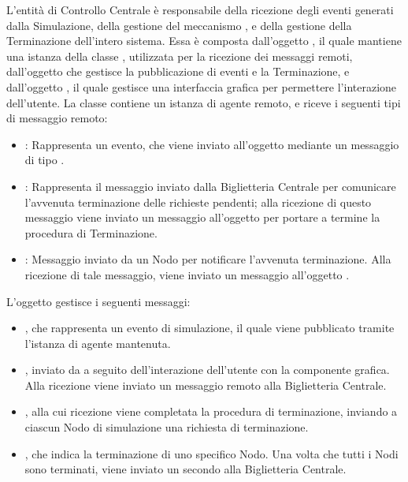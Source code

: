 	L'entità di Controllo Centrale è responsabile della ricezione degli eventi generati dalla Simulazione, della gestione del meccanismo , e della gestione della Terminazione dell'intero sistema.
	Essa è composta dall'oggetto , il quale mantiene una istanza della classe , utilizzata per la ricezione dei messaggi remoti, dall'oggetto   che gestisce la pubblicazione di eventi e la Terminazione, e dall'oggetto , il quale gestisce una interfaccia grafica per permettere l'interazione dell'utente.
	La classe  contiene un istanza di agente remoto, e riceve i seguenti tipi di messaggio remoto:
	\begin{itemize}
		\item {}: Rappresenta un evento, che viene inviato all'oggetto  mediante un messaggio di tipo .
		\item {}: Rappresenta il messaggio inviato dalla Biglietteria Centrale per comunicare l'avvenuta terminazione delle richieste pendenti; alla ricezione di questo messaggio viene inviato un messaggio  all'oggetto  per portare a termine la procedura di Terminazione.
		\item {}: Messaggio inviato da un Nodo per notificare l'avvenuta terminazione. Alla ricezione di tale messaggio, viene inviato un messaggio  all'oggetto .
	\end{itemize}
	L'oggetto  gestisce i seguenti messaggi:
	\begin{itemize}
		\item {}, che rappresenta un evento di simulazione, il quale viene pubblicato tramite l'istanza di agente mantenuta.
		\item {}, inviato da  a seguito dell'interazione dell'utente con la componente grafica. Alla ricezione viene inviato un messaggio remoto  alla Biglietteria Centrale.
		\item {}, alla cui ricezione viene completata la procedura di terminazione, inviando a ciascun Nodo di simulazione una richiesta di terminazione. 
		\item {}, che indica la terminazione di uno specifico Nodo. Una volta che tutti i Nodi sono terminati, viene inviato un secondo  alla Biglietteria Centrale. 
	\end{itemize}
